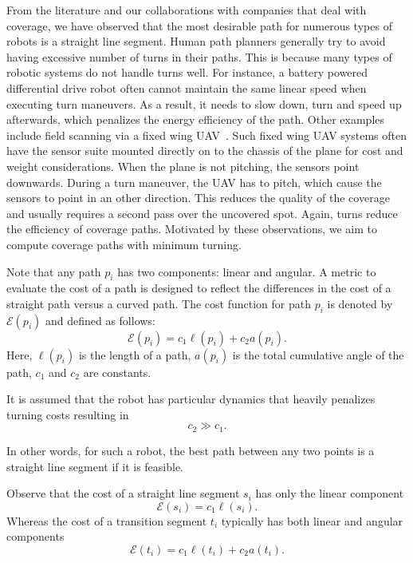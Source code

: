 \documentclass[../main.tex]{subfiles}
\begin{document}
From the literature and our collaborations with companies that deal with coverage, we have observed that the most desirable path for numerous types of robots is a straight line segment. Human path planners generally try to avoid having excessive number of turns in their paths. This is because many types of robotic systems do not handle turns well. For instance, a battery powered differential drive robot often cannot maintain the same linear speed when executing turn maneuvers. As a result, it needs to slow down, turn and speed up afterwards, which penalizes the energy efficiency of the path. Other examples include field scanning via a fixed wing UAV~\cite{frew2004vision}. Such fixed wing UAV systems often have the sensor suite mounted directly on to the chassis of the plane for cost and weight considerations. When the plane is not pitching, the sensors point downwards. During a turn maneuver, the UAV has to pitch, which cause the sensors to point in an other direction. This reduces the quality of the coverage and usually requires a second pass over the uncovered spot. Again, turns reduce the efficiency of coverage paths. Motivated by these observations, we aim to compute coverage paths with minimum turning.

Note that any path $p_i$ has two components: linear and angular. A metric to evaluate the cost of a path is designed to reflect the differences in the cost of a straight path versus a curved path. The cost function for path $p_i$ is denoted by $\mathcal{E}(p_i)$ and defined as follows:
\begin{equation}
	\mathcal{E}(p_i)=c_1\ell(p_i)+c_2a(p_i).
\end{equation}
Here, $\ell(p_i)$ is the length of a path, $a(p_i)$ is the total cumulative angle of the path, $c_1$ and $c_2$ are constants.

\begin{assumption}
It is assumed that the robot has particular dynamics that heavily penalizes turning costs resulting in
	\begin{equation}
		c_2 \gg c_1.
	\end{equation}
\end{assumption}
In other words, for such a robot, the best path between any two points is a straight line segment if it is feasible.

\begin{remark}
	Observe that the cost of a straight line segment $s_i$ has only the linear component
	\begin{equation}
		\mathcal{E}(s_i)=c_1\ell(s_i).
	\end{equation}
	Whereas the cost of a transition segment $t_i$ typically has both linear and angular components
	\begin{equation}
		\mathcal{E}(t_i)=c_1\ell(t_i)+c_2a(t_i).
	\end{equation}
	\RE
\end{remark}
\end{document}
